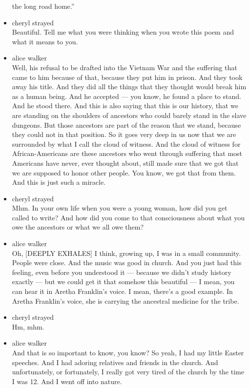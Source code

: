 \begin{itemize}
  the long road home.''
\item
  cheryl strayed\\
  Beautiful. Tell me what you were thinking when you wrote this poem and
  what it means to you.
\item
  alice walker\\
  Well, his refusal to be drafted into the Vietnam War and the suffering
  that came to him because of that, because they put him in prison. And
  they took away his title. And they did all the things that they
  thought would break him as a human being. And he accepted --- you
  know, he found a place to stand. And he stood there. And this is also
  saying that this is our history, that we are standing on the shoulders
  of ancestors who could barely stand in the slave dungeons. But those
  ancestors are part of the reason that we stand, because they could not
  in that position. So it goes very deep in us now that we are
  surrounded by what I call the cloud of witness. And the cloud of
  witness for African-Americans are these ancestors who went through
  suffering that most Americans have never, ever thought about, still
  made sure that we got that we are supposed to honor other people. You
  know, we got that from them. And this is just such a miracle.
\item
  cheryl strayed\\
  Mhm. In your own life when you were a young woman, how did you get
  called to write? And how did you come to that consciousness about what
  you owe the ancestors or what we all owe them?
\item
  alice walker\\
  Oh, {[}DEEPLY EXHALES{]} I think, growing up, I was in a small
  community. People were close. And the music was good in church. And
  you just had this feeling, even before you understood it --- because
  we didn't study history exactly --- but we could get it that somehow
  this beautiful --- I mean, you can hear it in Aretha Franklin's voice.
  I mean, there's a good example. In Aretha Franklin's voice, she is
  carrying the ancestral medicine for the tribe.
\item
  cheryl strayed\\
  Hm, mhm.
\item
  alice walker\\
  And that is so important to know, you know? So yeah, I had my little
  Easter speeches. And I had adoring relatives and friends in the
  church. And unfortunately, or fortunately, I really got very tired of
  the church by the time I was 12. And I went off into nature.

\end{itemize}

